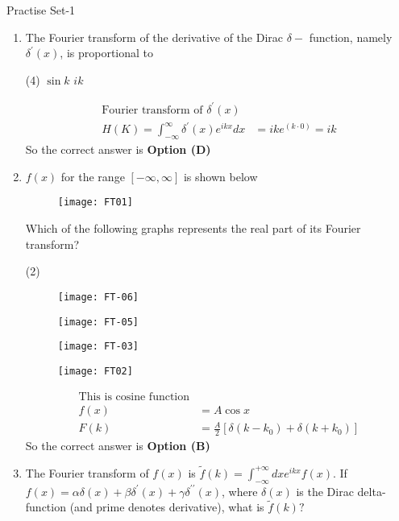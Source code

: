 \newpage
\begin{abox}
	Practise Set-1
\end{abox}
\begin{enumerate}
	
	\item The Fourier transform of the derivative of the Dirac $\delta-$ function, namely $\delta^{\prime}(x)$, is proportional to
	{}
	
	\begin{tasks}(4)
		\task[\textbf{C.}] $\sin k$
		\task[\textbf{D.}] $i k$
	\end{tasks}

	\begin{answer}
		\begin{align*}
		\text{Fourier transform of }\delta^{\prime}(x)\\
		H(K)=\int_{-\infty}^{\infty} \delta^{\prime}(x) e^{i k x} d x&=i k e^{(k \cdot 0)}=i k
		\end{align*}
		So the correct answer is \textbf{Option (D)}
	\end{answer}
\item  $f(x)$ for the range $[-\infty, \infty]$ is shown below {}
	\begin{figure}[H]
		\centering
		\texttt{[image: FT01]}
	\end{figure}
	Which of the following graphs represents the real part of its Fourier transform?
	\begin{tasks}(2)
		\task[\textbf{A.}]
		\begin{figure}[H]
			\centering
			\texttt{[image: FT-06]}
		\end{figure}
		\task[\textbf{B.}]	\begin{figure}[H]
			\centering
			\texttt{[image: FT-05]}
		\end{figure}
		\task[\textbf{C.}]	\begin{figure}[H]
			\centering
			\texttt{[image: FT-03]}
		\end{figure}
		\task[\textbf{D.}] 	\begin{figure}[H]
			\centering
			\texttt{[image: FT02]}
		\end{figure}
	\end{tasks}
\begin{answer}
	\begin{align*}
	\text{This is cosine function}\\
	f(x)&=A \cos x \\ F(k)&=\frac{A}{2}\left[\delta\left(k-k_{0}\right)+\delta\left(k+k_{0}\right)\right]
	\end{align*}
	So the correct answer is \textbf{Option (B)}
\end{answer}
	\item The Fourier transform of $f(x)$ is $\tilde{f}(k)=\int_{-\infty}^{+\infty} d x e^{i k x} f(x)$.
	If $f(x)=\alpha \delta(x)+\beta \delta^{\prime}(x)+\gamma \delta^{\prime \prime}(x)$, where $\delta(x)$ is the Dirac delta-function (and prime denotes derivative), what is $\tilde{f}(k) ?$
	{}
	

\end{enumerate}
